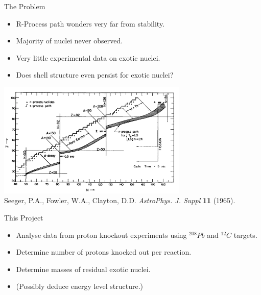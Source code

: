 \documentclass{beamer}
\begin{document}

\begin{frame}{The Problem}

\begin{itemize}
    \item R-Process path wonders very far from stability.
    \item Majority of nuclei never observed.
    \item Very little experimental data on exotic nuclei.
    \item Does shell structure even persist for exotic nuclei?
\end{itemize}

        \centering
        \includegraphics[height = 5.5cm]{RProcessPath}
       \\{\tiny Seeger, P.A., Fowler, W.A., Clayton, D.D. \textit{AstroPhys. J. Suppl} \textbf{11} (1965).}

\end{frame}


\begin{frame}{This Project}
\begin{itemize}
    \item Analyse data from proton knockout experiments using $^{208}Pb$ and $^{12}C$ targets.
    \item Determine number of protons knocked out per reaction.
    \item Determine masses of residual exotic nuclei.
    \item (Possibly deduce energy level structure.)
\end{itemize}

\end{frame}

\end{document}
